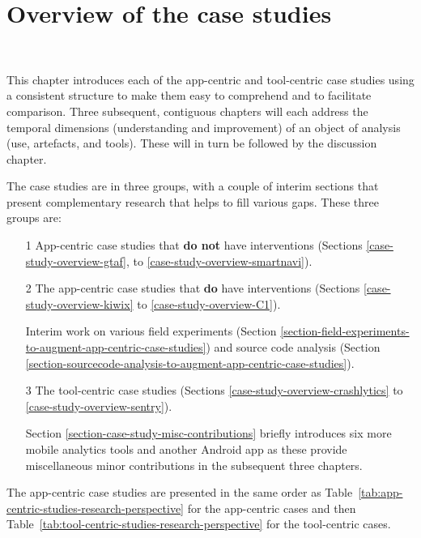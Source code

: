 \chapter{Overview of the case studies}~\label{chapter-case-studies-overview}

This chapter introduces each of the app-centric and tool-centric case studies using a consistent structure to make them easy to comprehend and to facilitate comparison. Three subsequent, contiguous chapters will each address the temporal dimensions (understanding and improvement) of an object of analysis (use, artefacts, and tools). These will in turn be followed by the discussion chapter.

The case studies are in three groups, with a couple of interim sections that present complementary research that helps to fill various gaps. These three groups are: 
\begin{enumerate}
    \itemsep0em
    \item[1] App-centric case studies that \textbf{do not} have interventions (Sections \ref{case-study-overview-gtaf}, to \ref{case-study-overview-smartnavi}).
    \item[2] The app-centric case studies that \textbf{do} have interventions (Sections \ref{case-study-overview-kiwix} to \ref{case-study-overview-C1}).
    \item[ ] Interim work on various field experiments (Section \ref{section-field-experiments-to-augment-app-centric-case-studies}) and source code analysis (Section \ref{section-sourcecode-analysis-to-augment-app-centric-case-studies}).
    \item[3] The tool-centric case studies (Sections \ref{case-study-overview-crashlytics} to \ref{case-study-overview-sentry}).
    \item[ ] Section \ref{section-case-study-misc-contributions} briefly introduces six more mobile analytics tools and another Android app as these provide miscellaneous minor contributions in the subsequent three chapters.
\end{enumerate}

The app-centric case studies are presented in the same order as Table~\ref{tab:app-centric-studies-research-perspective} for the app-centric cases and then Table~\ref{tab:tool-centric-studies-research-perspective} for the tool-centric cases. 

